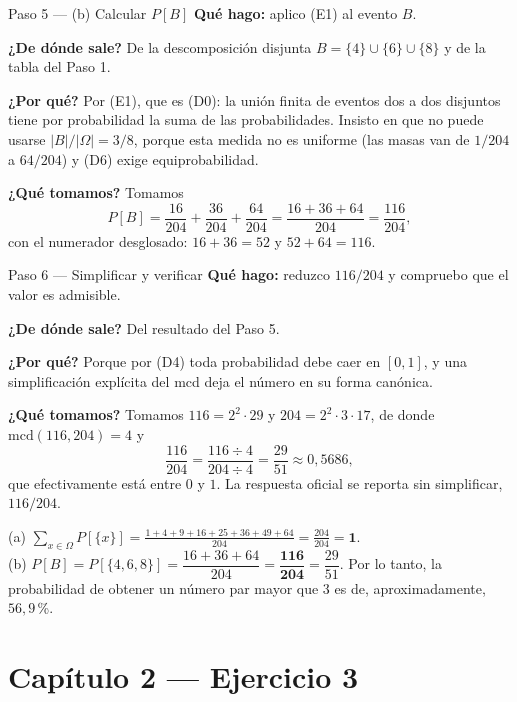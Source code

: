 \documentclass[11pt]{article}
\begin{document}
\begin{sol}
\begin{paso}{Paso 5 --- (b) Calcular $P[B]$}
\textbf{Qué hago:} aplico (E1) al evento $B$.

\textbf{¿De dónde sale?} De la descomposición disjunta $B=\{4\}\cup\{6\}\cup\{8\}$ y de la tabla
del Paso 1.

\textbf{¿Por qué?} Por (E1), que es (D0): la unión finita de eventos dos a dos disjuntos tiene
por probabilidad la suma de las probabilidades. Insisto en que no puede usarse
$|B|/|\Omega|=3/8$, porque esta medida no es uniforme (las masas van de $1/204$ a $64/204$) y
(D6) exige equiprobabilidad.

\textbf{¿Qué tomamos?} Tomamos
\[
P[B]=\frac{16}{204}+\frac{36}{204}+\frac{64}{204}=\frac{16+36+64}{204}=\frac{116}{204},
\]
con el numerador desglosado: $16+36=52$ y $52+64=116$.
\end{paso}

\begin{paso}{Paso 6 --- Simplificar y verificar}
\textbf{Qué hago:} reduzco $116/204$ y compruebo que el valor es admisible.

\textbf{¿De dónde sale?} Del resultado del Paso 5.

\textbf{¿Por qué?} Porque por (D4) toda probabilidad debe caer en $[0,1]$, y una simplificación
explícita del mcd deja el número en su forma canónica.

\textbf{¿Qué tomamos?} Tomamos $116=2^{2}\cdot 29$ y $204=2^{2}\cdot 3\cdot 17$, de donde
$\mathrm{mcd}(116,204)=4$ y
\[
\frac{116}{204}=\frac{116\div 4}{204\div 4}=\frac{29}{51}\approx 0{,}5686 ,
\]
que efectivamente está entre $0$ y $1$. La respuesta oficial se reporta sin simplificar,
$116/204$.
\end{paso}

\end{sol}

\begin{resp}
(a) $\displaystyle\sum_{x\in\Omega}P[\{x\}]=\frac{1+4+9+16+25+36+49+64}{204}=\frac{204}{204}=\mathbf{1}$.\\[4pt]
(b) $P[B]=P[\{4,6,8\}]=\dfrac{16+36+64}{204}=\mathbf{\dfrac{116}{204}}=\dfrac{29}{51}$. Por lo
tanto, la probabilidad de obtener un número par mayor que $3$ es de, aproximadamente,
$56{,}9$\,\%.
\end{resp}

\section*{Capítulo 2 --- Ejercicio 3}
\end{document}
